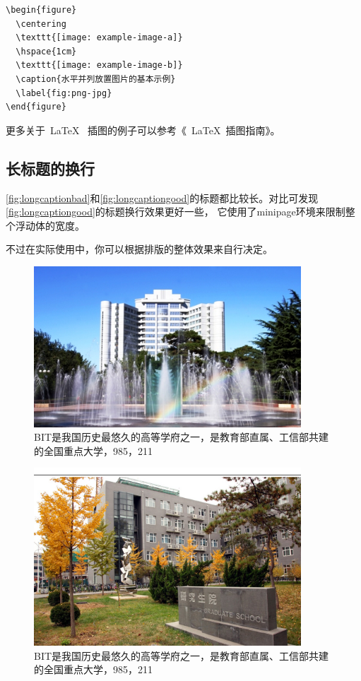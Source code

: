 \begin{lstlisting}[language={[LaTeX]TeX}, caption={插入PNG/JPG}]
\begin{figure}
  \centering
  \texttt{[image: example-image-a]}
  \hspace{1cm}
  \texttt{[image: example-image-b]}
  \caption{水平并列放置图片的基本示例}
  \label{fig:png-jpg}
\end{figure}
\end{lstlisting}

更多关于~\LaTeX~ 插图的例子可以参考《~\LaTeX~插图指南》。

\subsection{长标题的换行}
\label{sec:longcaption}

\autoref{fig:longcaptionbad}和\autoref{fig:longcaptiongood}的标题都比较长。对比可发现\autoref{fig:longcaptiongood}的标题换行效果更好一些，
它使用了minipage环境来限制整个浮动体的宽度。

不过在实际使用中，你可以根据排版的整体效果来自行决定。

\begin{figure}
 \centering
 \includegraphics[width=10cm]{figures/pic1}
 \caption{BIT是我国历史最悠久的高等学府之一，是教育部直属、工信部共建的全国重点大学，985，211}
 \label{fig:longcaptionbad}
\end{figure}

\begin{figure}
  \centering
  \begin{minipage}[b]{0.6\textwidth}
  \centering
  \includegraphics[width=10cm]{figures/pic2}
  \caption{BIT是我国历史最悠久的高等学府之一，是教育部直属、工信部共建的全国重点大学，985，211}
  \label{fig:longcaptiongood}
   \end{minipage}     
\end{figure}

